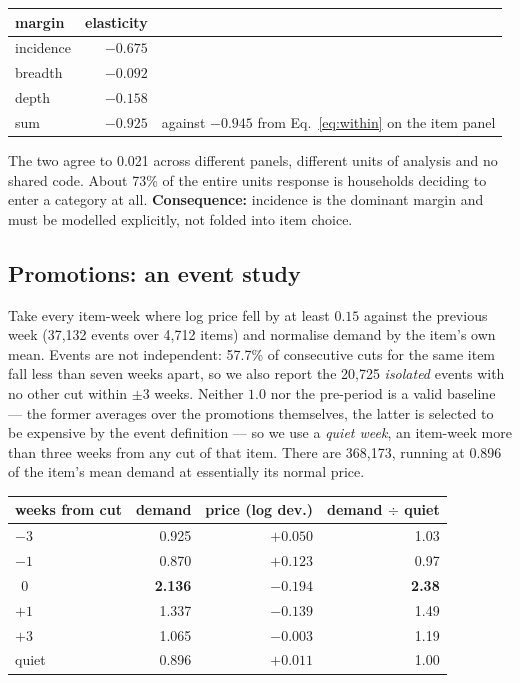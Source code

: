 \documentclass[11pt]{article}
\begin{document}
\begin{center}
\begin{tabular}{lrr}
\toprule
margin & elasticity & \\
\midrule
incidence & $-0.675$ & \\
breadth   & $-0.092$ & \\
depth     & $-0.158$ & \\
\midrule
sum & $-0.925$ & against $-0.945$ from Eq.~\ref{eq:within} on the item panel \\
\bottomrule
\end{tabular}
\end{center}

The two agree to 0.021 across different panels, different units of analysis and no
shared code. About 73\% of the entire units response is households deciding to
enter a category at all. \textbf{Consequence:} incidence is the dominant margin and must
be modelled explicitly, not folded into item choice.

\subsection{Promotions: an event study}

Take every item-week where log price fell by at least $0.15$ against the previous week
(37,132 events over 4,712 items) and normalise demand by the item's own mean.
Events are not independent: 57.7\% of consecutive cuts for the same item fall less
than seven weeks apart, so we also report the 20,725 \emph{isolated} events with no
other cut within $\pm3$ weeks. Neither $1.0$ nor the pre-period is a valid baseline ---
the former averages over the promotions themselves, the latter is selected to be
expensive by the event definition --- so we use a \emph{quiet week}, an item-week more
than three weeks from any cut of that item. There are 368,173, running at 0.896
of the item's mean demand at essentially its normal price.

\begin{center}
\begin{tabular}{lrrr}
\toprule
weeks from cut & demand & price (log dev.) & demand $\div$ quiet \\
\midrule
$-3$ & 0.925 & $+0.050$ & 1.03 \\
$-1$ & 0.870 & $+0.123$ & 0.97 \\
$\ \ 0$ & \textbf{2.136} & $-0.194$ & \textbf{2.38} \\
$+1$ & 1.337 & $-0.139$ & 1.49 \\
$+3$ & 1.065 & $-0.003$ & 1.19 \\
quiet & 0.896 & $+0.011$ & 1.00 \\
\bottomrule
\end{tabular}
\end{center}
\end{document}
